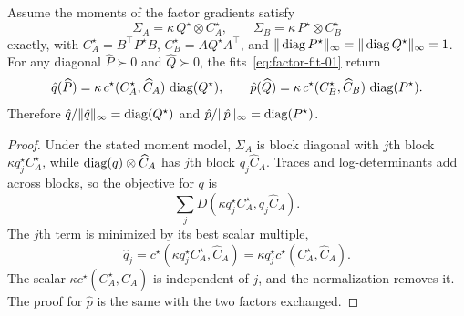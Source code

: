 \begin{lemma}\label{lem:consistency-01}
Assume the moments of the factor gradients satisfy
\[
  \Sigma_A=\kappa\,Q^\star\otimes C^\star_A,
  \qquad
  \Sigma_B=\kappa\,P^\star\otimes C^\star_B
\]
exactly, with
$C^\star_A=B^\top P^\star B$,
$C^\star_B=AQ^\star A^\top$, and
$\| \operatorname{diag} P^\star\|_\infty=\| \operatorname{diag} Q^\star\|_\infty=1$.
For any diagonal $\widehat P\succ0$ and $\widehat Q\succ0$, the
fits~\eqref{eq:factor-fit-01} return
\[
  \hat{q}(\widehat P)
  =
  \kappa\,c^\star(C^\star_A,\widehat C_A)\,\operatorname{diag}(Q^\star),
  \qquad
  \hat{p}(\widehat Q)
  =
  \kappa\,c^\star(C^\star_B,\widehat C_B)\,\operatorname{diag}(P^\star).
\]
Therefore
$\hat{q}/\| \hat{q}\|_\infty=\operatorname{diag}(Q^\star)$ and
$\hat{p}/\| \hat{p}\|_\infty=\operatorname{diag}(P^\star)$.
\end{lemma}
\begin{proof}
Under the stated moment model, $\Sigma_A$ is block diagonal
with $j$th block $\kappa q^\star_j C^\star_A$, while
$\operatorname{diag}(q)\otimes\widehat C_A$ has $j$th block $q_j\widehat C_A$.
Traces and log-determinants add across blocks, so the objective for
$q$ is
\[
  \sum_j D(\kappa q^\star_j C^\star_A, q_j\widehat C_A).
\]
The $j$th term is minimized by its best scalar multiple,
\[
  \hat q_j
  =
  c^\star(\kappa q^\star_j C^\star_A,\widehat C_A)
  =
  \kappa q^\star_j c^\star(C^\star_A,\widehat C_A).
\]
The scalar $\kappa c^\star(C^\star_A,\widehat C_A)$ is independent of
$j$, and the normalization removes it. The proof for $\hat p$ is the
same with the two factors exchanged.
\end{proof}

